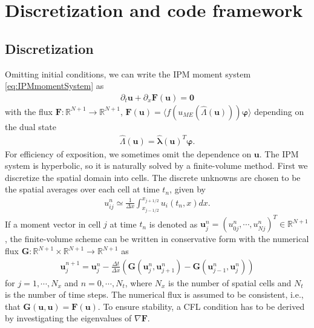 \section{Discretization and code framework}
\label{sec:framework}
\subsection{Discretization}
Omitting initial conditions, we can write the IPM moment system \eqref{eq:IPMmomentSystem} as
\begin{align*}
\partial_t \bm{u}+\partial_x \bm{F}(\bm{u}) = \bm{0}
\end{align*}
with the flux $\bm{F}:\mathbb{R}^{N+1}\to\mathbb{R}^{N+1}$, $\bm{F}(\bm{u})=\langle f(u_{ME}(\hat \Lambda(\bm{u})))\bm{\varphi} \rangle$ depending on the dual state 
\begin{align*}
\hat \Lambda(\bm{u}) = \bm{\hat{\lambda}}(\bm{u})^T\bm{\varphi}.
\end{align*}
For efficiency of exposition, we sometimes omit the dependence on $\bm{u}$.
The IPM system is hyperbolic, so it is naturally solved by a finite-volume method. First we discretize the spatial domain into cells. The discrete unknowns are chosen to be the spatial averages over each cell at time $t_n$, given by
\begin{align*}
u_{ij}^n \simeq \frac{1}{\Delta x}\int_{x_{j-1/ 2}}^{x_{j+1/ 2}}u_i(t_n,x) dx.
\end{align*}
If a moment vector in cell $j$ at time $t_n$ is denoted as $\bm{u}_j^n = (u_{0j}^n,\cdots,u_{Nj}^n)^T\in\mathbb{R}^{N+1}$, the finite-volume scheme can be written in conservative form with the numerical flux $\bm{G}:\mathbb{R}^{N+1}\times\mathbb{R}^{N+1}\to\mathbb{R}^{N+1}$ as
\begin{align}\label{eq:IPMDiscretization}
\bm{u}_{j}^{n+1} = \bm{u}_{j}^{n}  - \frac{\Delta t}{\Delta x}\left( \bm{G}(\bm{u}_j^n,\bm{u}_{j+1}^n)- \bm{G}(\bm{u}_{j-1}^n,\bm{u}_{j}^n)\right)
\end{align}
for $j = 1,\cdots,N_x$ and $n = 0,\cdots,N_t$, where $N_x$ is the number of spatial cells and $N_t$ is the number of time steps.
The numerical flux is assumed to be consistent, i.e., that $\bm{G}(\bm{u},\bm{u})=\bm{F}(\bm{u})$.
To ensure stability, a CFL condition has to be derived by investigating the eigenvalues of $\nabla \bm{F}$.


